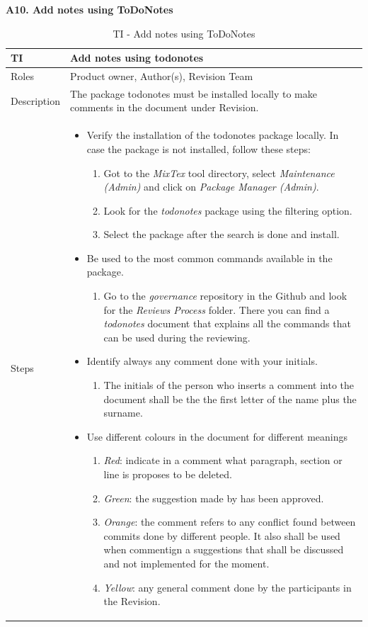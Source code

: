 \documentclass{template/openetcs_article}
\begin{document}
\textbf{A10. Add notes using ToDoNotes}
\begin{table}[H]
\begin{tabular}{|m{2cm}|m{12cm}|}
\hline
\rowcolor{myblue}
TI & 
Add notes using todonotes
\\\hline
Roles &
Product owner, Author(s), Revision Team
\\\hline
Description &
The package todonotes must be installed locally to make comments in the document under Revision. 
\\\hline
Steps &
\begin{itemize}
\item Verify the installation of the todonotes package locally. In case the package is not installed, follow these steps:
\begin{enumerate}
\item Got to the {\it MixTex} tool directory, select {\it Maintenance (Admin)} and click on {\it Package Manager (Admin)}.
\item Look for the {\it todonotes} package using the filtering option.
\item Select the package after the search is done and install.
\end{enumerate}
\item Be used to the most common commands available in the package.
\begin{enumerate}
\item Go to the {\it governance} repository in the Github and look for the {\it Reviews Process} folder. There you can find a {\it todonotes} document that explains all the commands that can be used during the reviewing.
\end{enumerate}
\item Identify always any comment done with your initials.
\begin{enumerate} 
\item The initials of the person who inserts a comment into the document shall be the the first letter of the name plus the surname.
\end{enumerate}
\item Use different colours in the document for different meanings 
\begin{enumerate}
\item {\it Red}: indicate in a comment what paragraph, section or line is proposes to be deleted. 
\item {\it Green}: the suggestion made by has been approved.
\item {\it Orange}: the comment refers to any conflict found between commits done by different people. It also shall be used when commentign a suggestions that shall be discussed and not implemented for the moment.
\item {\it Yellow}: any general comment done by the participants in the Revision. 
\end{enumerate} 
\end{itemize}
\\\hline
\end{tabular}
\caption{TI -  Add notes using ToDoNotes}
\end{table}
\end{document}
